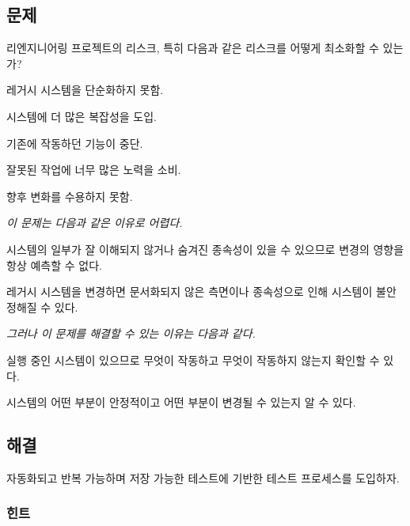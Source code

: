 \documentclass[a4paper,10pt,twoside]{book}
\begin{document}


\subsection*{문제}

리엔지니어링 프로젝트의 리스크, 특히 다음과 같은 리스크를 어떻게 최소화할 수 있는가?

\begin{bulletlist}
\item 레거시 시스템을 단순화하지 못함.
\item 시스템에 더 많은 복잡성을 도입.
\item 기존에 작동하던 기능이 중단.
\item 잘못된 작업에 너무 많은 노력을 소비.
\item 향후 변화를 수용하지 못함.
\end{bulletlist}

\emph{이 문제는 다음과 같은 이유로 어렵다.}

\begin{bulletlist}
\item 시스템의 일부가 잘 이해되지 않거나 숨겨진 종속성이 있을 수 있으므로 변경의 영향을 항상 예측할 수 없다. 
\item 레거시 시스템을 변경하면 문서화되지 않은 측면이나 종속성으로 인해 시스템이 불안정해질 수 있다.
\end{bulletlist}

\emph{그러나 이 문제를 해결할 수 있는 이유는 다음과 같다.}

\begin{bulletlist}
\item 실행 중인 시스템이 있으므로 무엇이 작동하고 무엇이 작동하지 않는지 확인할 수 있다.
\item 시스템의 어떤 부분이 안정적이고 어떤 부분이 변경될 수 있는지 알 수 있다.
\end{bulletlist}

\subsection*{해결}

자동화되고 반복 가능하며 저장 가능한 테스트에 기반한 테스트 프로세스를 도입하자.
\subsubsection*{힌트}
\end{document}
